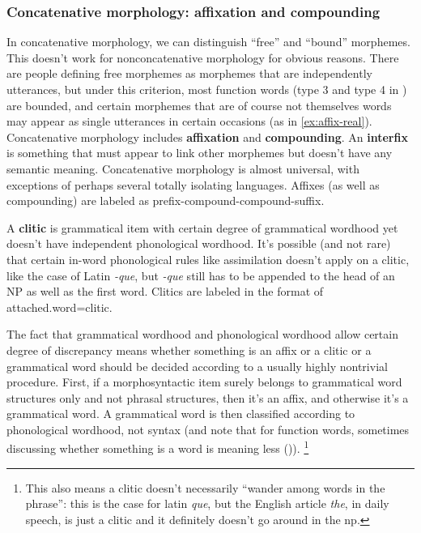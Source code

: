 \documentclass[UTF8, a4paper, oneside, scheme=plain]{ctexart}
\newcommand*{\concept}[1]{\textbf{#1}}
\newcommand*{\corpus}[1]{\emph{#1}}
\begin{document}
\subsubsection{Concatenative morphology: affixation and compounding}

In concatenative morphology, we can distinguish ``free'' and ``bound'' morphemes. 
This doesn't work for nonconcatenative morphology for obvious reasons.
There are people defining free morphemes as morphemes that are independently utterances,
but under this criterion,
most function words (type 3 and type 4 in ) are bounded,
and certain morphemes that are of course not themselves words 
may appear as single utterances in certain occasions (as in \eqref{ex:affix-real}).
Concatenative morphology includes \concept{affixation} and \concept{compounding}.
An \concept{interfix} is something that must appear to link other morphemes 
but doesn't have any semantic meaning.
Concatenative morphology is almost universal, 
with exceptions of perhaps several totally isolating languages.
Affixes (as well as compounding) are labeled as prefix-compound-compound-suffix.

A \concept{clitic} is grammatical item with certain degree of grammatical wordhood 
yet doesn't have independent phonological wordhood.
It's possible (and not rare) 
that certain in-word phonological rules like assimilation doesn't apply on a clitic,
like the case of Latin \corpus{-que}, 
but \corpus{-que} still has to be appended to
the head of an NP as well as the first word.
Clitics are labeled in the format of attached.word=clitic. 

The fact that grammatical wordhood and phonological wordhood allow certain degree of discrepancy
means whether something is an affix or a clitic or a grammatical word should be decided according to 
a usually highly nontrivial procedure.
First, if a morphosyntactic item surely belongs to grammatical word structures only
and not phrasal structures,
then it's an affix,
and otherwise it's a grammatical word.
A grammatical word is then classified according to phonological wordhood, not syntax
(and note that for function words,
sometimes discussing whether something is a word is meaning less ()).%
\footnote{
    This also means a clitic doesn't necessarily ``wander among words in the phrase'':
    this is the case for latin \corpus{que},
    but the English article \corpus{the}, 
    in daily speech, is just a clitic 
    and it definitely doesn't go around in the \ac{np}.
}
\end{document}
